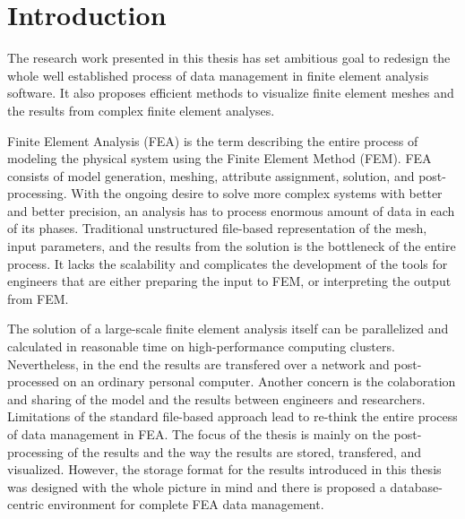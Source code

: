 \chapter{Introduction}

The research work presented in this thesis has set ambitious goal to redesign the whole well established process of data management in finite element analysis software. It also proposes efficient methods to visualize finite element meshes and the results from complex finite element analyses.

Finite Element Analysis (FEA) is the term describing the entire process of modeling the physical system using the Finite Element Method (FEM). FEA consists of model generation, meshing, attribute assignment, solution, and post-processing. With the ongoing desire to solve more complex systems with better and better precision, an analysis has to process enormous amount of data in each of its phases. Traditional unstructured file-based representation of the mesh, input parameters, and the results from the solution is the bottleneck of the entire process. It lacks the scalability and complicates the development of the tools for engineers that are either preparing the input to FEM, or interpreting the output from FEM.

The solution of a large-scale finite element analysis itself can be parallelized and calculated in reasonable time on high-performance computing clusters. Nevertheless, in the end the results are transfered over a network and post-processed on an ordinary personal computer. Another concern is the colaboration and sharing of the model and the results between engineers and researchers. Limitations of the standard file-based approach lead to re-think the entire process of data management in FEA. The focus of the thesis is mainly on the post-processing of the results and the way the results are stored, transfered, and visualized. However, the storage format for the results introduced in this thesis was designed with the whole picture in mind and there is proposed a database-centric environment for complete FEA data management.


